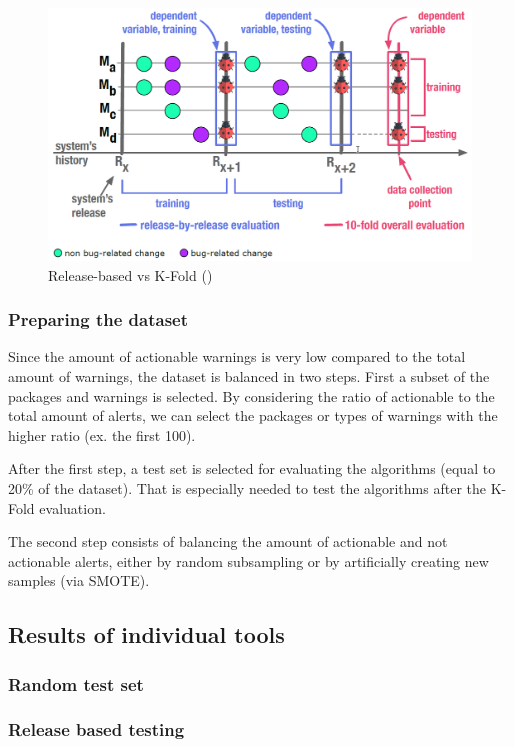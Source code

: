 \documentclass{article}
\begin{document}
\begin{figure}[H]
    \centering
    \includegraphics[scale=0.3]{./src/release_based_testing.png}
    \caption{Release-based vs K-Fold (\cite{performance_method_bug})}
\end{figure}


\subsubsection{Preparing the dataset}
Since the amount of actionable warnings is very low compared to the total amount of warnings, the dataset is balanced in two steps. First a subset of the packages and warnings is selected. By considering the ratio of actionable to the total amount of alerts, we can select the packages or types of warnings with the higher ratio (ex. the first 100).

After the first step, a test set is selected for evaluating the algorithms (equal to 20\% of the dataset).
That is especially needed to test the algorithms after the K-Fold evaluation.

The second step consists of balancing the amount of actionable and not actionable alerts, either by random subsampling or by artificially creating new samples (via SMOTE).


\subsection{Results of individual tools}

\subsubsection{Random test set}
\subsubsection{Release based testing}
\end{document}
